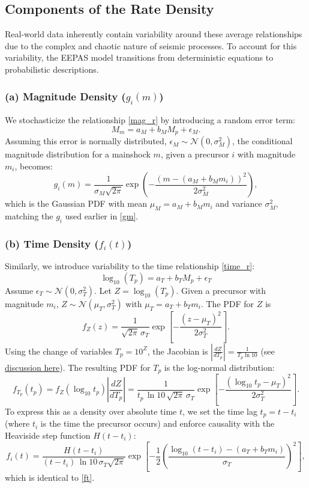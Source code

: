 \documentclass[linenum,doublespace,onecolumn]{SSA-SRL}
\theoremstyle{lemma}
\begin{document}
\subsection{Components of the Rate Density}

Real-world data inherently contain variability around these average relationships due to the complex and chaotic nature of seismic processes. To account for this variability, the EEPAS model transitions from deterministic equations to probabilistic descriptions.

\subsubsection{(a) Magnitude Density (\texorpdfstring{$g_i(m)$}{gi(m)})}

We stochasticize the relationship \eqref{mag_r} by introducing a random error term:
\[
M_m = a_M + b_M M_p + \epsilon_M.
\]
Assuming this error is normally distributed, $\epsilon_M \sim \mathcal{N}(0, \sigma_M^2)$, the conditional magnitude distribution for a mainshock \(m\), given a precursor \(i\) with magnitude \(m_i\), becomes:
\begin{equation}
g_i(m) = \frac{1}{\sigma_M \sqrt{2\pi}} \exp\!\left( -\frac{(m - (a_M + b_M m_i))^2}{2\sigma_M^2} \right),
\end{equation}
which is the Gaussian PDF with mean \(\mu_M = a_M + b_M m_i\) and variance \(\sigma_M^2\), matching the $g_i$ used earlier in \eqref{gm}.

\subsubsection{(b) Time Density (\texorpdfstring{$f_i(t)$}{fi(t)})}

Similarly, we introduce variability to the time relationship \eqref{time_r}:
\[
\log_{10}(T_p) = a_T + b_T M_p + \epsilon_T
\]
Assume $\epsilon_T \sim \mathcal{N}(0,\sigma_T^2)$. Let $Z = \log_{10}(T_p)$. Given a precursor with magnitude $m_i$, $Z \sim \mathcal{N}(\mu_T,\sigma_T^2)$ with $\mu_T = a_T+b_T m_i$. The PDF for $Z$ is
\[
f_Z(z) = \frac{1}{\sqrt{2\pi}\,\sigma_T}\exp\!\left[-\frac{(z-\mu_T)^2}{2\sigma_T^2}\right].
\]
Using the change of variables $T_p=10^{Z}$, the Jacobian is $\left|\frac{dZ}{dT_p}\right|=\frac{1}{T_p\ln 10}$ (see \href{https://en.wikipedia.org/wiki/Probability_density_function#Function_of_random_variables_and_change_of_variables_in_the_probability_density_function}{discussion here}). The resulting PDF for $T_p$ is the log-normal distribution:
\[
f_{T_p}(t_p) = f_Z(\log_{10} t_p) \left|\frac{dZ}{dT_p}\right| = \frac{1}{t_p\,\ln 10\,\sqrt{2\pi}\,\sigma_T}\exp\!\left[-\frac{(\log_{10} t_p-\mu_T)^2}{2\sigma_T^2}\right].
\]
To express this as a density over absolute time $t$, we set the time lag $t_p = t-t_i$ (where $t_i$ is the time the precursor occurs) and enforce causality with the Heaviside step function $H(t-t_i)$:
\begin{equation}
f_i(t) = \frac{H(t - t_i)}{(t - t_i)\,\ln 10\,\sigma_T \sqrt{2\pi}}
\exp\!\left[-\frac{1}{2}\left(\frac{\log_{10}(t - t_i) - (a_T + b_T m_i)}{\sigma_T}\right)^2\right],
\end{equation}
which is identical to \eqref{ft}.
\end{document}
